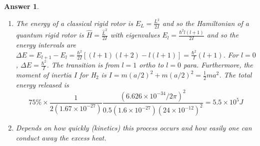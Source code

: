 \documentclass[a4paper]{article}
\newtheorem{ans}{Answer}[subsection]
\theoremstyle{new}
\begin{document}
\begin{ans}
\begin{enumerate}[label=(\roman*)]
$$R(r)Y_{l,m}(\theta,\phi)\mapsto R(r)Y_{lm}(\pi-\theta,\pi+\phi)=R(r)(-1)^lY_{l,m}(\theta,\phi)\implies\psi(r,\theta,\phi)\mapsto\psi(r,\theta,\phi)(-1)^l$$
which suggests $l$ must be even (odd) for even (odd) symmetry.
\item The energy of a classical rigid rotor is $E_L=\frac{L^2}{2I}$ and so the Hamiltonian of a quantum rigid rotor is $\hat{H}=\frac{\hat{L}^2}{2I}$ with eigenvalues $E_l=\frac{\hbar^2l(l+1)}{2I}$ and so the energy intervals are $\Delta E=E_{l+1}-E_l=\frac{\hbar^2}{2I}[(l+1)(l+2)-l(l+1)]=\frac{\hbar^2}{I}(l+1)$. For $l=0$, $\Delta E=\frac{\hbar^2}{I}$. The transition is from $l=1$ ortho to $l=0$ para. Furthermore, the moment of inertia $I$ for H$_2$ is $I=m(a/2)^2+m(a/2)^2=\frac{1}{2}ma^2$. The total energy released is $$75\%\times\frac{1}{2(1.67\times10^{-27})}\frac{(6.626\times10^{-34}/2\pi)^2}{0.5(1.6\times10^{-27})(24\times10^{-12})^2}=5.5\times10^5J$$
\item Depends on how quickly (kinetics) this process occurs and how easily one can conduct away the excess heat.
\end{enumerate}
\end{ans}
\newpage
\end{document}
